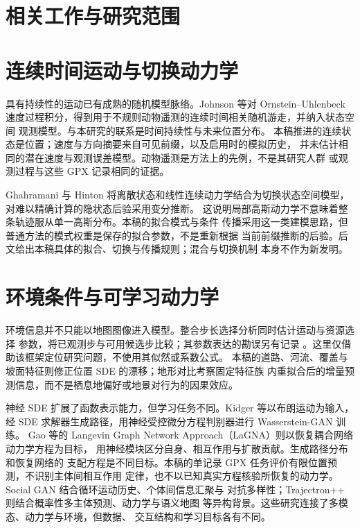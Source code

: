 \section{相关工作与研究范围}\label{sec:related-work}\hypertarget{sec:related-work}{}

\section{连续时间运动与切换动力学}
具有持续性的运动已有成熟的随机模型脉络。Johnson 等对 Ornstein--Uhlenbeck
速度过程积分，得到用于不规则动物遥测的连续时间相关随机游走，并纳入状态空间
观测模型\cite{johnson2008}。与本研究的联系是时间持续性与未来位置分布。
本稿推进的连续状态是位置；速度与方向摘要来自可见前缀，以及启用时的模拟历史，
并未估计相同的潜在速度与观测误差模型。动物遥测是方法上的先例，不是其研究人群
或观测过程与这些 GPX 记录相同的证据。

Ghahramani 与 Hinton 将离散状态和线性连续动力学结合为切换状态空间模型，
对难以精确计算的隐状态后验采用变分推断\cite{ghahramani2000}。
这说明局部高斯动力学不意味着整条轨迹服从单一高斯分布。本稿的拟合模式与条件
传播采用这一类建模思路，但普通方法的模式权重是保存的拟合参数，不是重新根据
当前前缀推断的后验。后文给出本稿具体的拟合、切换与传播规则；混合与切换机制
本身不作为新发明。


\section{环境条件与可学习动力学}
环境信息并不只能以地图图像进入模型。整合步长选择分析同时估计运动与资源选择
参数，将已观测步与可用候选步比较\cite{avgar2016}；其参数表达的勘误另有记录
\cite{avgar2017correction}。这里仅借助该框架定位研究问题，不使用其似然或系数公式。
本稿的道路、河流、覆盖与坡面特征则修正位置 SDE 的漂移；地形对比考察固定特征族
内重拟合后的增量预测信息，而不是栖息地偏好或地景对行为的因果效应。

神经 SDE 扩展了函数表示能力，但学习任务不同。Kidger 等以布朗运动为输入，经 SDE
求解器生成路径，用神经受控微分方程判别器进行 Wasserstein-GAN 训练\cite{kidger2021}。
Gao 等的 Langevin Graph Network Approach（LaGNA）则以恢复耦合网络动力学方程为目标，
用神经模块区分自身、相互作用与扩散贡献\cite{gao2024}。生成路径分布和恢复网络的
支配方程是不同目标。本稿的单记录 GPX 任务评价有限位置预测，不识别主体间相互作用
定律，也不以已知真实方程核验所恢复的动力学。Social GAN 结合循环运动历史、个体间信息汇聚与
对抗多样性\cite{gupta2018}；Trajectron++ 则结合概率性多主体预测、动力学与语义地图
等异构背景\cite{salzmann2020}。这些研究连接了多模态、动力学与环境，但数据、
交互结构和学习目标各有不同。

